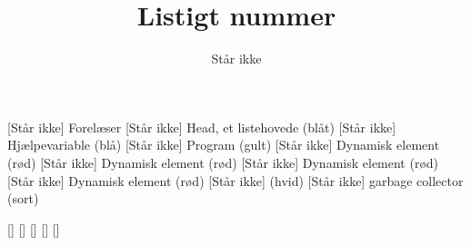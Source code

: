 \documentclass[a4paper,11pt]{article}
\title{Listigt nummer}
\author{Står ikke}
\begin{document}
\maketitle

\begin{roles}
[Står ikke] Forelæser
[Står ikke] Head, et listehovede (blåt)
[Står ikke] Hjælpevariable (blå)
[Står ikke] Program (gult)
[Står ikke] Dynamisk element (rød)
[Står ikke] Dynamisk element (rød)
[Står ikke] Dynamisk element (rød)
[Står ikke] Dynamisk element (rød)
[Står ikke] (hvid)
[Står ikke] garbage collector (sort)
\end{roles}

\begin{props}
[]
[]
[]
[]
[]
\end{props}
\end{document}
